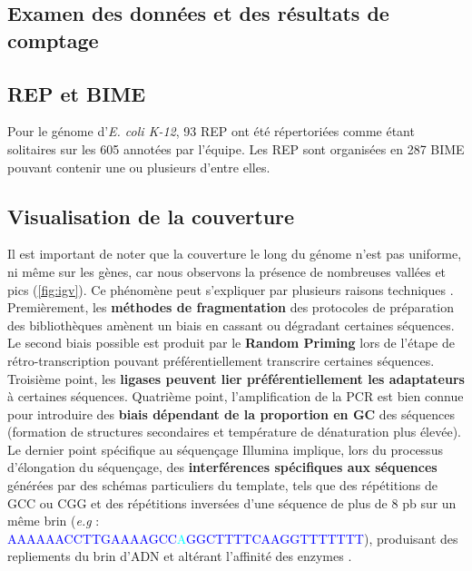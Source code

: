 \documentclass[12pt,a4paper]{report}
\begin{document}
\begin{onehalfspace}
\section*{Examen des données et des résultats de comptage}

\subsection*{REP et BIME}
Pour le génome d'\textit{E. coli K-12}, 93 REP ont été répertoriées comme étant solitaires sur les 605 annotées par l'équipe. Les REP sont organisées en 287 BIME pouvant contenir une ou plusieurs d'entre elles. 

\subsection*{Visualisation de la couverture}
\label{uniformite_couverture}
Il est important de noter que la couverture le long du génome n'est pas uniforme, ni même sur les gènes, car nous observons la présence de nombreuses vallées et pics (\autoref{fig:igv}). Ce phénomène peut s'expliquer par plusieurs raisons techniques \citep{Li2013}. Premièrement, les \textbf{méthodes de fragmentation} des protocoles de préparation des bibliothèques amènent un biais en cassant ou dégradant certaines séquences. Le second biais possible est produit par le \textbf{Random Priming} lors de l'étape de rétro-transcription pouvant préférentiellement transcrire certaines séquences. Troisième point, les \textbf{ligases peuvent lier préférentiellement les adaptateurs} à certaines séquences. Quatrième point, l'amplification de la PCR est bien connue pour introduire des \textbf{biais dépendant de la proportion en GC} des séquences (formation de structures secondaires et température de dénaturation plus élevée). Le dernier point spécifique au séquençage Illumina implique, lors du processus d'élongation du séquençage, des \textbf{interférences spécifiques aux séquences} générées par des schémas particuliers du template, tels que des répétitions de GCC ou CGG et des répétitions inversées d'une séquence de plus de 8 pb sur un même brin (\textit{e.g} : \textcolor{blue}{AAAAAACCTTGAAAAGCC}\textcolor{cyan}{A}\textcolor{blue}{GGCTTTTCAAGGTTTTTTT}), produisant des repliements du brin d'ADN et altérant l'affinité des enzymes \citep{Nakamura2011}. 


\end{onehalfspace}
\end{document}
